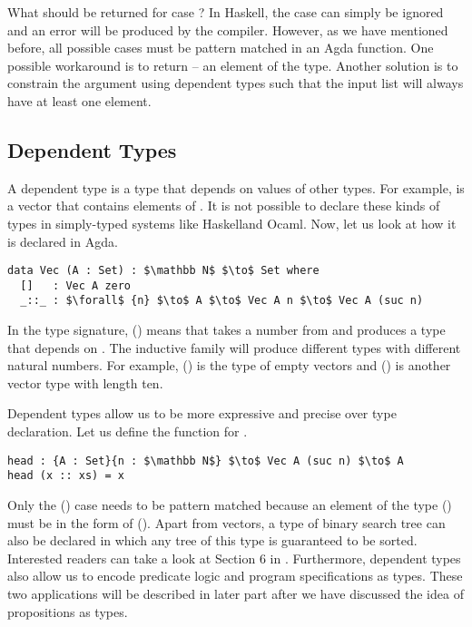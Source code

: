 \par What should be returned for case \mb{[\ ]}? In Haskell, the \mb{[\
  ]} case can simply be ignored and an error will be produced by the
compiler. However, as we have mentioned
before, all possible cases must be pattern matched in an Agda function. One
possible workaround is to return \mb{nothing} -- an element of the
\mb{Maybe} type. Another solution is
to constrain the argument using dependent types such that the input
list will always have at least one element. 


\subsection{Dependent Types}
\par A dependent type is a type that depends on values of other
types. For example,  is a vector that contains  elements
of \mb{A}. It is not possible to declare these kinds of types in
simply-typed systems like Haskell\footnotemark and Ocaml. Now, let
us look at how it is declared in Agda.
\begin{lstlisting}[mathescape=true,xleftmargin=.3\textwidth]
data Vec (A : Set) : $\mathbb N$ $\to$ Set where
  []   : Vec A zero
  _::_ : $\forall$ {n} $\to$ A $\to$ Vec A n $\to$ Vec A (suc n)
\end{lstlisting} 

\par In the type signature, () means
that  takes a number  from  and produces a
type that depends on \mb{n}. The inductive family \mb{Vec} will
produce different types with different natural numbers. For example, () is
the type of empty vectors and (\mb{Vec\ A\ 10}) is another vector type with length ten. 

\par Dependent types allow us to be more
expressive and precise over type declaration. Let us define the
 function for . 
\begin{lstlisting}[mathescape=true,xleftmargin=.3\textwidth]
head : {A : Set}{n : $\mathbb N$} $\to$ Vec A (suc n) $\to$ A
head (x :: xs) = x 
\end{lstlisting} 

\par Only the () case needs to be pattern matched because
an element of the type (\mb{Vec\ A\ (suc\ n)}) must be in the form of
(\mb{x :: xs}). Apart from vectors, a type of binary
search tree can also be declared in which any tree of this type is guaranteed to be
sorted. Interested readers can take a look at 
Section 6 in \cite{bove2009}. Furthermore, dependent types also allow
us to encode predicate logic and program specifications as
types. These two applications will be described in later part after we
have discussed the idea of propositions as types. 



